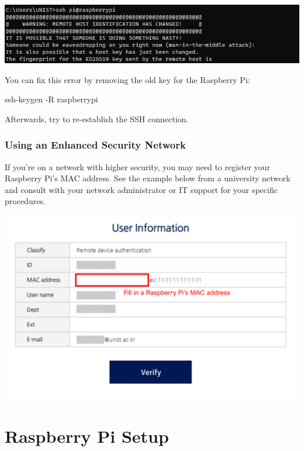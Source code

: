 \documentclass[
  letterpaper,
]{scrbook}
\newenvironment{Shaded}{\begin{snugshade}}{\end{snugshade}}
\newcommand{\AttributeTok}[1]{\textcolor[rgb]{0.40,0.45,0.13}{#1}}
\newcommand{\FunctionTok}[1]{\textcolor[rgb]{0.28,0.35,0.67}{#1}}
\newcommand{\NormalTok}[1]{\textcolor[rgb]{0.00,0.23,0.31}{#1}}
\begin{document}
\includegraphics{content/material/ch2/ssh_error.png}

You can fix this error by removing the old key for the Raspberry Pi:

\begin{Shaded}
\begin{Highlighting}[]
\FunctionTok{ssh{-}keygen} \AttributeTok{{-}R}\NormalTok{ raspberrypi}
\end{Highlighting}
\end{Shaded}

Afterwards, try to re-establish the SSH connection.

\subsection{Using an Enhanced Security
Network}\label{using-an-enhanced-security-network}

If you're on a network with higher security, you may need to register
your Raspberry Pi's MAC address. See the example below from a university
network and consult with your network administrator or IT support for
your specific procedures.

\includegraphics[width=5.20833in,height=\textheight]{content/material/ch2/network_unist.png}

\chapter{Raspberry Pi Setup}\label{raspberry-pi-setup}
\end{document}
